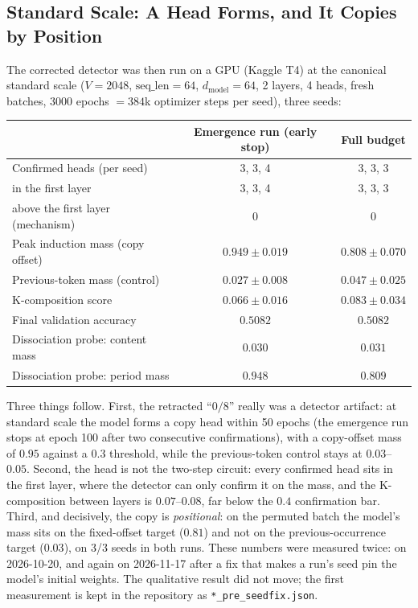 \documentclass[11pt]{article}
\begin{document}
\subsection{Standard Scale: A Head Forms, and It Copies by Position}
The corrected detector was then run on a GPU (Kaggle T4) at the canonical
standard scale ($V=2048$, $\text{seq\_len}=64$, $d_\text{model}=64$, 2 layers,
4 heads, fresh batches, 3000 epochs $=384$k optimizer steps per seed), three
seeds:

\begin{center}
\begin{tabular}{lcc}
\toprule
 & Emergence run (early stop) & Full budget \\
\midrule
Confirmed heads (per seed) & 3, 3, 4 & 3, 3, 3 \\
\quad in the first layer & 3, 3, 4 & 3, 3, 3 \\
\quad above the first layer (mechanism) & 0 & 0 \\
Peak induction mass (copy offset) & $0.949 \pm 0.019$ & $0.808 \pm 0.070$ \\
Previous-token mass (control) & $0.027 \pm 0.008$ & $0.047 \pm 0.025$ \\
K-composition score & $0.066 \pm 0.016$ & $0.083 \pm 0.034$ \\
Final validation accuracy & $0.5082$ & $0.5082$ \\
Dissociation probe: content mass & $0.030$ & $0.031$ \\
Dissociation probe: period mass & $0.948$ & $0.809$ \\
\bottomrule
\end{tabular}
\end{center}

Three things follow. First, the retracted ``$0/8$'' really was a detector
artifact: at standard scale the model forms a copy head within 50 epochs
(the emergence run stops at epoch 100 after two consecutive confirmations),
with a copy-offset mass of $0.95$ against a $0.3$ threshold, while the
previous-token control stays at $0.03$--$0.05$. Second, the head is not the
two-step circuit: every confirmed head sits in the first layer, where the
detector can only confirm it on the mass, and the K-composition between
layers is $0.07$--$0.08$, far below the $0.4$ confirmation bar. Third, and
decisively, the copy is \emph{positional}: on the permuted batch the model's
mass sits on the fixed-offset target ($0.81$) and not on the
previous-occurrence target ($0.03$), on 3/3 seeds in both runs.
These numbers were measured twice: on 2026-10-20, and again on 2026-11-17 after a fix that makes a
run's seed pin the model's initial weights. The qualitative result did not move; the first
measurement is kept in the repository as \texttt{*\_pre\_seedfix.json}.
\end{document}
